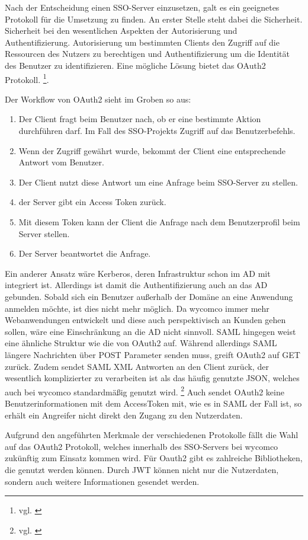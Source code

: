 Nach der Entscheidung einen \acs{SSO}-Server einzusetzen, galt es ein geeignetes Protokoll für die Umsetzung zu finden. 
An erster Stelle steht dabei die Sicherheit. Sicherheit bei den wesentlichen Aspekten der Autorisierung und Authentifizierung. Autorisierung um bestimmten Clients den Zugriff auf die Ressourcen des Nutzers zu berechtigen und Authentifizierung um die Identität des Benutzer zu identifizieren. Eine mögliche Lösung bietet das OAuth2 Protokoll. \footnote{vgl. \cite{OAuth2}}.

Der Workflow von OAuth2 sieht im Groben so aus: 

\begin{enumerate}
\item Der Client fragt beim Benutzer nach, ob er eine bestimmte Aktion durchführen darf. Im Fall des SSO-Projekts Zugriff auf das Benutzerbefehls.
\item Wenn der Zugriff gewährt wurde, bekommt der Client eine entsprechende Antwort vom Benutzer.
\item Der Client nutzt diese Antwort um eine Anfrage beim SSO-Server zu stellen.
\item der Server gibt ein Access Token zurück.
\item Mit diesem Token kann der Client die Anfrage nach dem Benutzerprofil beim Server stellen.
\item Der Server beantwortet die Anfrage.
\end{enumerate}

Ein anderer Ansatz wäre Kerberos, deren Infrastruktur schon im \acs{AD} mit integriert ist. Allerdings ist damit die Authentifizierung auch an das \acs{AD} gebunden. Sobald sich ein Benutzer außerhalb der Domäne an eine Anwendung anmelden möchte, ist dies nicht mehr möglich. Da wycomco immer mehr Webanwendungen entwickelt und diese auch perspektivisch an Kunden gehen sollen, wäre eine Einschränkung an die AD nicht sinnvoll. 
\acs{SAML} hingegen weist eine ähnliche Struktur wie die von OAuth2 auf. Während allerdings SAML längere Nachrichten über POST Parameter senden muss, greift OAuth2 auf GET zurück. Zudem sendet SAML XML Antworten an den Client zurück, der wesentlich komplizierter zu verarbeiten ist als das häufig genutzte JSON, welches auch bei wycomco standardmäßig genutzt wird. \footnote{vgl. \cite{SSO-Vgl}}
Auch sendet OAuth2 keine Benutzerinformationen mit dem AccessToken mit, wie es in SAML der Fall ist, so erhält ein Angreifer nicht direkt den Zugang zu den Nutzerdaten.

Aufgrund den angeführten Merkmale der verschiedenen Protokolle fällt die Wahl auf das OAuth2 Protokoll, welches innerhalb des SSO-Servers bei wycomco zukünftig zum Einsatz kommen wird. Für Oauth2 gibt es zahlreiche Bibliotheken, die genutzt werden können. Durch \acs{JWT} können nicht nur die Nutzerdaten, sondern auch weitere Informationen gesendet werden.

